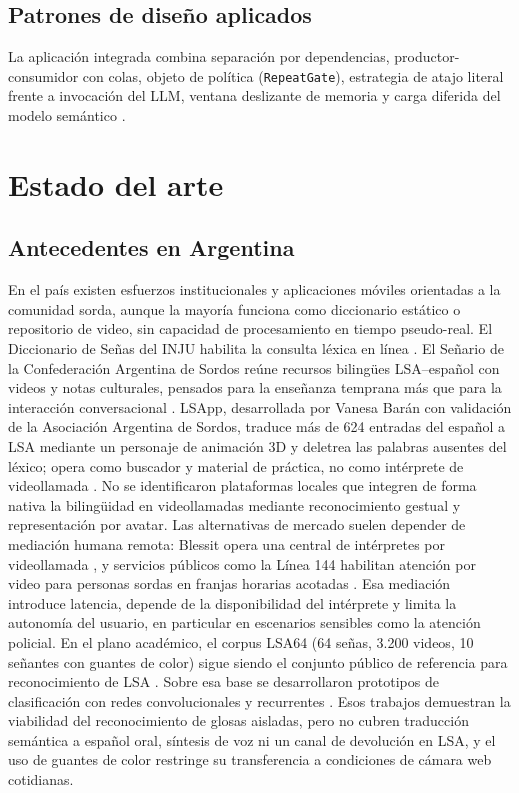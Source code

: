 \documentclass[12pt,a4paper]{report}
\begin{document}
\subsection{Patrones de diseño aplicados}
La aplicación integrada combina separación por dependencias, productor-consumidor con colas, objeto de política (\texttt{RepeatGate}), estrategia de atajo literal frente a invocación del LLM, ventana deslizante de memoria y carga diferida del modelo semántico \parencite{gamma1994design}.

\section{Estado del arte}
\subsection{Antecedentes en Argentina}
En el país existen esfuerzos institucionales y aplicaciones móviles orientadas a la comunidad sorda, aunque la mayoría funciona como diccionario estático o repositorio de video, sin capacidad de procesamiento en tiempo pseudo-real. El Diccionario de Señas del INJU habilita la consulta léxica en línea \parencite{inju2024diccionario}. El Señario de la Confederación Argentina de Sordos reúne recursos bilingües LSA--español con videos y notas culturales, pensados para la enseñanza temprana más que para la interacción conversacional \parencite{cas2024senario}. LSApp, desarrollada por Vanesa Barán con validación de la Asociación Argentina de Sordos, traduce más de 624 entradas del español a LSA mediante un personaje de animación 3D y deletrea las palabras ausentes del léxico; opera como buscador y material de práctica, no como intérprete de videollamada \parencite{lsapp2018}.
No se identificaron plataformas locales que integren de forma nativa la bilingüidad en videollamadas mediante reconocimiento gestual y representación por avatar. Las alternativas de mercado suelen depender de mediación humana remota: Blessit opera una central de intérpretes por videollamada \parencite{blessit2024interpretes}, y servicios públicos como la Línea 144 habilitan atención por video para personas sordas en franjas horarias acotadas \parencite{argentina2024linea144}. Esa mediación introduce latencia, depende de la disponibilidad del intérprete y limita la autonomía del usuario, en particular en escenarios sensibles como la atención policial.
En el plano académico, el corpus LSA64 (64 señas, 3.200 videos, 10 señantes con guantes de color) sigue siendo el conjunto público de referencia para reconocimiento de LSA \parencite{ronchetti2016lsa64}. Sobre esa base se desarrollaron prototipos de clasificación con redes convolucionales y recurrentes \parencite{mindlin2021reconocimiento}. Esos trabajos demuestran la viabilidad del reconocimiento de glosas aisladas, pero no cubren traducción semántica a español oral, síntesis de voz ni un canal de devolución en LSA, y el uso de guantes de color restringe su transferencia a condiciones de cámara web cotidianas.
\end{document}
